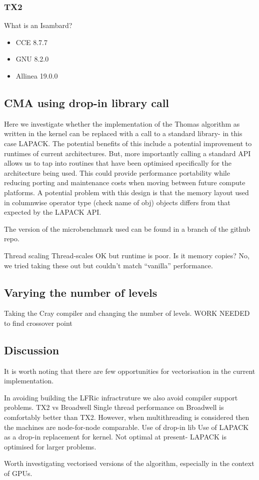 \subsubsection{TX2}
What is an Isambard?
\begin{itemize}
\item CCE 8.7.7
\item GNU 8.2.0
\item Allinea 19.0.0
\end{itemize}

\subsection{CMA using drop-in library call}
Here we investigate whether the implementation of the Thomas algorithm as written in the kernel can be replaced with a call to a standard library- in this case LAPACK.
The potential benefits of this include a potential improvement to runtimes of current architectures.
But, more importantly calling a standard API allows us to tap into routines that have been optimised specifically for the architecture being used.
This could provide performance portability while reducing porting and maintenance costs when moving between future compute platforms.
A potential problem with this design is that the memory layout used in columnwise operator type (check name of obj) objects differs from that expected by the LAPACK API.

The version of the microbenchmark used can be found in a branch of the github repo.

Thread scaling
Thread-scales OK but runtime is poor.
Is it memory copies? No, we tried taking these out but couldn't match ``vanilla'' performance.

\subsection{Varying the number of levels}
Taking the Cray compiler and changing the number of levels.
WORK NEEDED to find crossover point

\subsection{Discussion}

It is worth noting that there are few opportunities for vectorisation in the current implementation.

In avoiding building the LFRic infractruture we also avoid compiler support problems.
TX2 vs Broadwell
Single thread performance on Broadwell is comfortably better than TX2. However, when multithreading is considered then the machines are node-for-node comparable.
Use of drop-in lib
Use of LAPACK as a drop-in replacement for kernel. Not optimal at present- LAPACK is optimised for larger problems.

Worth investigating vectorised versions of the algorithm, especially in the context of GPUs.
